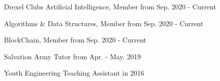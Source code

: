 
\begin{cvskills}
  \cvskill
  {Drexel Clubs}
  {Artificial Intelligence, Member from Sep. 2020 - Current}
  
  \cvskill
  {}
  {Algorithms \& Data Structures, Member from Sep. 2020 - Current}
  
  \cvskill
  {}
  {BlockChain, Member from Sep. 2020 - Current}
  
  \cvskill
  {Salvation Army}
  {Tutor from Apr. - May. 2019}
  
  \cvskill
  {Youth Engineering}
  {Teaching Assistant in 2016}
\end{cvskills}